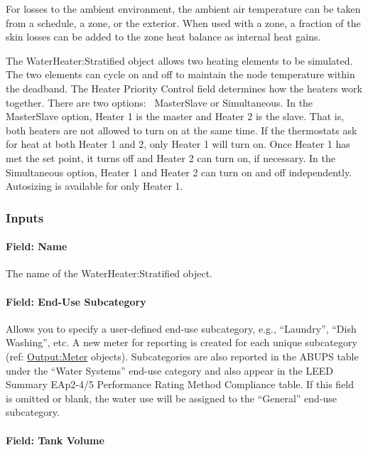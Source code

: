 For losses to the ambient environment, the ambient air temperature can be taken from a schedule, a zone, or the exterior. When used with a zone, a fraction of the skin losses can be added to the zone heat balance as internal heat gains.

The WaterHeater:Stratified object allows two heating elements to be simulated. The two elements can cycle on and off to maintain the node temperature within the deadband. The Heater Priority Control field determines how the heaters work together. There are two options:~ MasterSlave or Simultaneous. In the MasterSlave option, Heater 1 is the master and Heater 2 is the slave. That is, both heaters are not allowed to turn on at the same time. If the thermostats ask for heat at both Heater 1 and 2, only Heater 1 will turn on. Once Heater 1 has met the set point, it turns off and Heater 2 can turn on, if necessary. In the Simultaneous option, Heater 1 and Heater 2 can turn on and off independently.~ Autosizing is available for only Heater 1.

\subsubsection{Inputs}\label{inputs-1-049}

\paragraph{Field: Name}\label{field-name-1-047}

The name of the WaterHeater:Stratified object.

\paragraph{Field: End-Use Subcategory}\label{field-end-use-subcategory-004}

Allows you to specify a user-defined end-use subcategory, e.g., ``Laundry'', ``Dish Washing'', etc. A new meter for reporting is created for each unique subcategory~ (ref: \hyperref[outputmeter-and-outputmetermeterfileonly]{Output:Meter} objects). Subcategories are also reported in the ABUPS table under the ``Water Systems'' end-use category and also appear in the LEED Summary EAp2-4/5 Performance Rating Method Compliance table. If this field is omitted or blank, the water use will be assigned to the ``General'' end-use subcategory.

\paragraph{Field: Tank Volume}\label{field-tank-volume-1-000}

